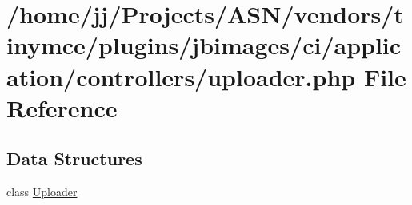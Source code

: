 \hypertarget{uploader_8php}{}\section{/home/jj/\+Projects/\+A\+S\+N/vendors/tinymce/plugins/jbimages/ci/application/controllers/uploader.php File Reference}
\label{uploader_8php}
\subsection*{Data Structures}
\begin{DoxyCompactItemize}
\item 
class \hyperlink{class_uploader}{Uploader}
\end{DoxyCompactItemize}
